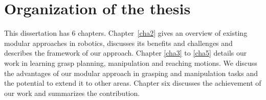 



\section{Organization of the thesis}
\label{cha1:organization}
This dissertation has 6 chapters. Chapter~\ref{cha2} gives an overview of existing modular approaches in robotics, discusses its benefits and challenges and describes the framework of our approach. Chapter \ref{cha3} to \ref{cha5} details our work in learning grasp planning, manipulation and reaching motions. We discuss the advantages of our modular approach in grasping and manipulation tasks and the potential to extend it to other areas. Chapter six discusses the achievement of our work and summarizes the contribution.

